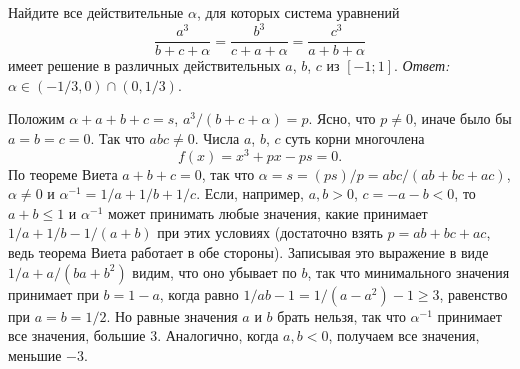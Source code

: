 \problem
Найдите все действительные $\alpha$, для которых система уравнений
\[
    \frac{a^3}{b + c + \alpha}
=
    \frac{b^3}{c + a + \alpha}
=
    \frac{c^3}{a + b + \alpha}
\]
имеет решение в различных действительных $a$, $b$, $c$ из $[-1; 1]$.
\solution
\emph{Ответ:} $\alpha \in (-1/3, 0) \cap (0, 1/3)$.
\par
Положим $\alpha + a + b + c = s$, $a^3 / (b + c + \alpha) = p$.
Ясно, что $p \ne 0$, иначе было бы $a = b = c = 0$.
Так что $a b c \ne 0$.
Числа $a$, $b$, $c$ суть корни многочлена \[f(x)=x^3+px-ps=0.\]
По теореме Виета $a + b + c = 0$, так что
$\alpha = s = (p s) / p = a b c / (a b + b c + a c)$,
$\alpha \ne 0$
и
$\alpha^{-1} = 1 / a + 1 / b + 1 / c$.
Если, например, $a, b > 0$, $c = -a - b < 0$, то
$a + b \leq 1$ и $\alpha^{-1}$
может принимать любые значения, какие принимает
$1 / a + 1 / b - 1 / (a + b)$
при этих условиях
(достаточно взять $p = a b + b c + a c$, ведь теорема Виета работает в обе
стороны).
Записывая это выражение в виде $1 / a + a / (b a + b^2)$ видим, что оно убывает
по $b$, так что минимального значения принимает при $b = 1 - a$, когда равно
$1 / a b - 1 = 1 / (a - a^2) - 1 \geq 3$, равенство при $a = b = 1 / 2$.
Но равные значения $a$ и $b$ брать нельзя, так что $\alpha^{-1}$ принимает все
значения, большие $3$.
Аналогично, когда $a, b < 0$, получаем все значения, меньшие $-3$.
\endproblem
